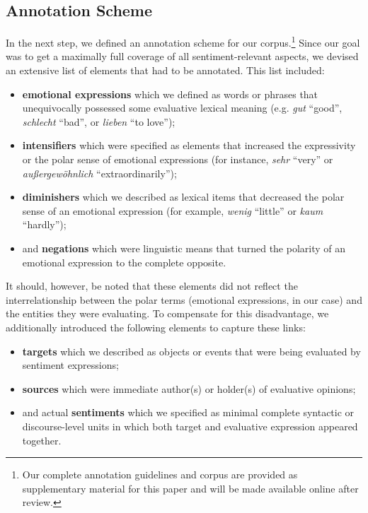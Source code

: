 \subsection{Annotation Scheme}\label{subsec:snt:ascheme}
In the next step, we defined an annotation scheme for our
corpus.\footnote{Our complete annotation guidelines and corpus are
  provided as supplementary material for this paper and will be made
  available online after review.}  Since our goal was to get a
maximally full coverage of all sentiment-relevant aspects, we devised
an extensive list of elements that had to be annotated.  This list
included:
\begin{itemize}
  \item\textbf{emotional expressions} which we defined as words or
    phrases that unequivocally possessed some evaluative lexical
    meaning (e.g. \emph{gut} ``good'', \emph{schlecht} ``bad'', or
    \emph{lieben} ``to love'');
  \item\textbf{intensifiers} which were specified as elements that
    increased the expressivity or the polar sense of emotional
    expressions (for instance, \emph{sehr} ``very'' or
    \emph{au\ss{}ergew\"ohnlich} ``extraordinarily'');
  \item\textbf{diminishers} which we described as lexical items that
    decreased the polar sense of an emotional expression (for example,
    \emph{wenig} ``little'' or \emph{kaum} ``hardly'');
  \item and \textbf{negations} which were linguistic means that turned
    the polarity of an emotional expression to the complete opposite.

\end{itemize}
It should, however, be noted that these elements did not reflect the
interrelationship between the polar terms (emotional expressions, in
our case) and the entities they were evaluating.  To compensate for
this disadvantage, we additionally introduced the following elements
to capture these links:
\begin{itemize}
  \item\textbf{targets} which we described as objects or events that
    were being evaluated by sentiment expressions;
  \item\textbf{sources} which were immediate author(s) or holder(s) of
    evaluative opinions;
  \item and actual \textbf{sentiments} which we specified as minimal
    complete syntactic or discourse-level units in which both target
    and evaluative expression appeared together.
\end{itemize}

